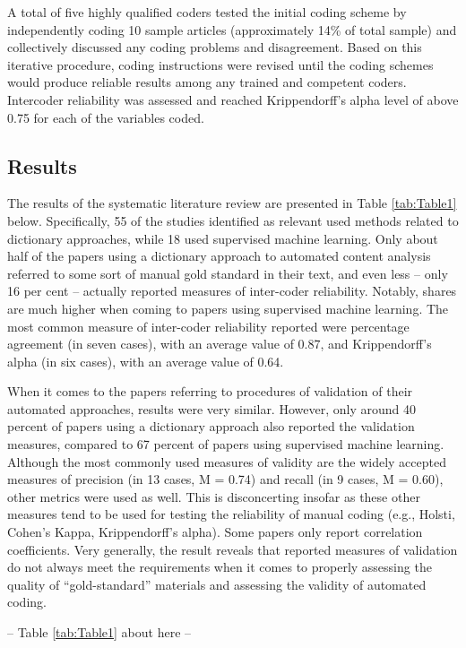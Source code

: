 \documentclass[man, 12pt, a4paper, nolmodern, noextraspace]{apa6}
\begin{document}
    A total of five highly qualified coders tested the initial coding scheme by independently coding 10 sample articles (approximately 14\% of total sample) and collectively discussed any coding problems and disagreement. Based on this iterative procedure, coding instructions were revised until the coding schemes would produce reliable results among any trained and competent coders. Intercoder reliability was assessed and reached Krippendorff’s alpha level of above 0.75 for each of the variables coded.   
    
\subsection{Results}

    The results of the systematic literature review are presented in Table \ref{tab:Table1} below. Specifically, 55 of the studies identified as relevant used methods related to dictionary approaches, while 18 used supervised machine learning. Only about half of the papers using a dictionary approach to automated content analysis referred to some sort of manual gold standard in their text, and even less – only 16 per cent – actually reported measures of inter-coder reliability. Notably, shares are much higher when coming to papers using supervised machine learning. The most common measure of inter-coder reliability reported were percentage agreement (in seven cases), with an average value of 0.87, and Krippendorff’s alpha (in six cases), with an average value of 0.64.
    
    When it comes to the papers referring to procedures of validation of their automated approaches, results were very similar. However, only around 40 percent of papers using a dictionary approach also reported the validation measures, compared to 67 percent of papers using supervised machine learning. Although the most commonly used measures of validity are the widely accepted measures of precision (in 13 cases, M = 0.74) and recall (in 9 cases, M = 0.60), other metrics were used as well. This is disconcerting insofar as these other measures tend to be used for testing the reliability of manual coding (e.g., Holsti, Cohen’s Kappa, Krippendorff’s alpha). Some papers only report correlation coefficients. Very generally, the result reveals that reported measures of validation do not always meet the requirements when it comes to properly assessing the quality of \enquote{gold-standard} materials and assessing the validity of automated coding.
    \centerline{ -- Table \ref{tab:Table1} about here -- }    
\end{document}

